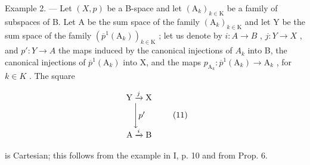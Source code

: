 Example 2. --- Let \((X,p)\) be a B-space and let \((\mathrm{A}_{k})_{k\in\mathrm{K}}\) be a family of subspaces of B. Let A be the sum space of the family \((\mathrm{A}_{k})_{k\in\mathrm{K}}\) and let Y be the sum space of the family \((\overline{p}^{1}(\mathrm{A}_{k}))_{k\in\mathrm{K}}\) ; let us denote by \(i: A \to B\) , \(j: Y \to X\) , and \(p': Y \to A\) the maps induced by the canonical injections of \(A_{k}\) into B, the canonical injections of \(\overline{p}^{1}(\mathrm{A}_{k})\) into X, and the maps \(p_{\mathrm{A}_{k}}: \overline{p}^{1}(\mathrm{A}_{k}) \to \mathrm{A}_{k}\) , for \(k \in K\) . The square

\[
\begin{array}{c} \mathrm{Y} \xrightarrow {j} \mathrm{X} \\ \Biggl \downarrow p ^ {\prime} \\ \mathrm{A} \xrightarrow {i} \mathrm{B} \end{array}\tag{11}
\]

is Cartesian; this follows from the example in I, p. 10 and from Prop. 6.

